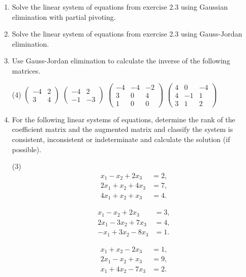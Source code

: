 \documentclass[a4paper,11pt]{article}
\begin{document}
\begin{enumerate}[label=2.\arabic*]
    \item Solve the linear system of equations from exercise 2.3 using Gaussian elimination with partial pivoting.

    \item Solve the linear system of equations from exercise 2.3 using Gauss-Jordan elimination.
    
    \item Use Gauss-Jordan elimination to calculate the inverse of the following matrices.
    \begin{tasks}(4)
        \task $ \begin{pmatrix} -4 & 2 \\ 3 & 4 \end{pmatrix} $
        \task $ \begin{pmatrix} -4 & 2 \\ -1 & -3 \end{pmatrix} $
        \task $ \begin{pmatrix} -4 & -4 & - 2\\ 3 & 0 & 4 \\ 1 & 0 & 0 \end{pmatrix} $
        \task $ \begin{pmatrix} 4 & 0 & -4 \\ 4 & -1 & 1 \\ 3 & 1 & 2 \end{pmatrix} $
    \end{tasks}

    \item For the following linear systems of equations, determine the rank of the coefficient matrix and the augmented matrix and classify the system is consistent, inconsistent or indeterminate and calculate the solution (if possible).
    \begin{tasks}(3)
        \task 
        \begin{align*}
             x_{1} -  x_{2} + 2 x_{3} &= 2, \\
             2 x_{1} +  x_{2} + 4 x_{3} &= 7, \\
             4 x_{1} +  x_{2} +  x_{3} &= 4.
        \end{align*}

        \task 
        \begin{align*}
             x_{1} -  x_{2} + 2 x_{3} &= 3, \\
             2 x_{1} - 3 x_{2} + 7 x_{3} &= 4, \\
             - x_{1} + 3 x_{2} - 8 x_{3} &= 1.
        \end{align*}

        \task 
        \begin{align*}
             x_{1} +  x_{2} - 2 x_{3} &= 1, \\
             2 x_{1} -  x_{2} +  x_{3} &= 9, \\
             x_{1} + 4 x_{2} - 7 x_{3} &= 2.
        \end{align*}
    \end{tasks}
\end{enumerate}
\end{document}

